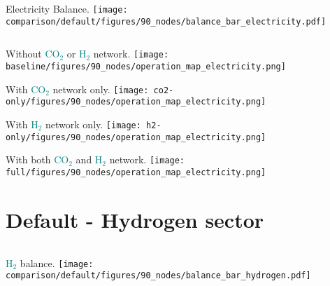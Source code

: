 \documentclass[12pt, aspectratio=169]{beamer}
\newcommand{\carbon}{\textcolor{teal}{CO$_2$}}
\newcommand{\hydrogen}{\textcolor{teal}{H$_2$}}
\begin{document}
\begin{frame}
    \begin{columns}
        Electricity Balance.
        \texttt{[image: comparison/default/figures/90\_nodes/balance\_bar\_electricity.pdf]}
    \end{columns}
\end{frame}

\begin{frame}
    \begin{center}
    Without \carbon{} or \hydrogen{} network.
    \texttt{[image: baseline/figures/90\_nodes/operation\_map\_electricity.png]}
    \end{center}
\end{frame}


\begin{frame}
    \begin{center}
    With \carbon{} network only.
    \texttt{[image: co2-only/figures/90\_nodes/operation\_map\_electricity.png]}
    \end{center}
\end{frame}

\begin{frame}
    \begin{center}
    With \hydrogen{} network only.
    \texttt{[image: h2-only/figures/90\_nodes/operation\_map\_electricity.png]}
    \end{center}
\end{frame}

\begin{frame}
    \begin{center}
    With both \carbon{}  and \hydrogen{} network.
    \texttt{[image: full/figures/90\_nodes/operation\_map\_electricity.png]}
    \end{center}
\end{frame}

\section*{Default - Hydrogen sector}

\begin{frame}
    \begin{columns}
        \hydrogen{} balance.
        \texttt{[image: comparison/default/figures/90\_nodes/balance\_bar\_hydrogen.pdf]}
    \end{columns}
\end{frame}
\end{document}
